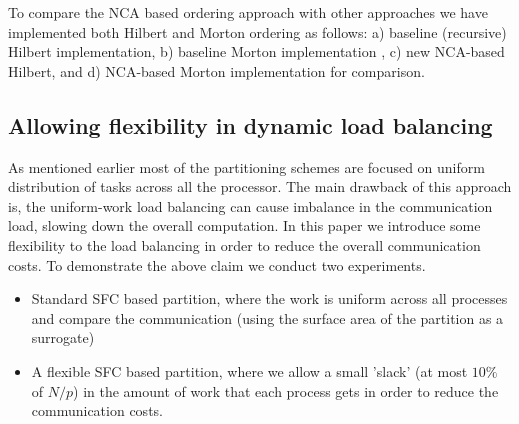 \documentclass{sig-alternate}
\begin{document}
To compare the NCA based ordering approach with other approaches we have
implemented both Hilbert and Morton ordering as follows: a) baseline (recursive) Hilbert implementation, b) baseline Morton implementation \cite{sundar2007}, c) new NCA-based Hilbert, and d) NCA-based Morton implementation for comparison. 





\subsection{Allowing flexibility in dynamic load balancing}

As mentioned earlier most of the partitioning schemes are focused on uniform distribution of tasks across all the processor. The main drawback of this approach is, the uniform-work load balancing can cause
imbalance in the communication load, slowing down the overall computation. In this paper we introduce some flexibility to the load balancing in order to reduce the overall communication
costs. 
To demonstrate the above claim we conduct two experiments.
\begin{itemize}
\item Standard SFC based partition, where the work is uniform across all processes and compare the communication (using the surface area of the partition as a surrogate)
\item A flexible SFC based partition, where we allow a small 'slack' (at most $10\%$ of $N/p$) in the amount of work that each process gets in order to reduce the communication costs. 
\end{itemize}
\end{document}
